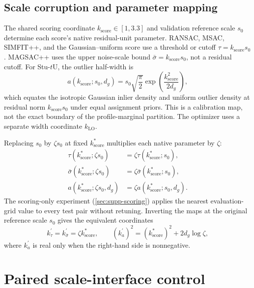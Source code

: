 \documentclass[runningheads]{llncs}
\newcommand{\stuU}{Stu-$t$U}
\newcommand{\kscore}{k_{\mathrm{score}}}
\newcommand{\klo}{k_{\mathrm{LO}}}
\begin{document}
\subsection{Scale corruption and parameter mapping}
\label{sec:supp-scale-mapping}
The shared scoring coordinate $\kscore\in[1,3.3]$ and validation reference
scale $s_0$ determine each score's native residual-unit parameter. RANSAC,
MSAC, SIMFIT++, and the Gaussian--uniform score use a threshold or cutoff
$\tau=\kscore s_0$. MAGSAC++ uses the upper noise-scale bound
$\bar\sigma=\kscore s_0$, not a residual cutoff. For \stuU{}, the outlier
half-width is
\begin{equation}
a(\kscore;s_0,d_g)=s_0\sqrt{\frac{\pi}{2}}
\exp\!\left(\frac{\kscore^2}{2d_g}\right),
\label{eq:native-scale-maps}
\end{equation}
which equates the isotropic Gaussian inlier density and uniform outlier
density at residual norm $\kscore s_0$ under equal assignment priors. This
is a calibration map, not the exact boundary of the profile-marginal
partition. The optimizer uses a separate width coordinate $\klo$.

Replacing $s_0$ by $\zeta s_0$ at fixed $\kscore^*$ multiplies each native
parameter by $\zeta$:
\begin{equation}
\begin{aligned}
\tau(\kscore^*;\zeta s_0)&=\zeta\tau(\kscore^*;s_0),\\
\bar\sigma(\kscore^*;\zeta s_0)&=\zeta\bar\sigma(\kscore^*;s_0),\\
a(\kscore^*;\zeta s_0,d_g)&=\zeta a(\kscore^*;s_0,d_g).
\end{aligned}
\label{eq:native-scale-corruption}
\end{equation}
The scoring-only experiment (\cref{sec:supp-scoring}) applies the nearest
evaluation-grid value to every test pair without retuning. Inverting the maps
at the original reference scale $s_0$ gives the equivalent coordinates
\begin{equation}
k_{\tau}^{\prime}=k_{\bar\sigma}^{\prime}=\zeta\kscore^*,
\qquad
(k_a^{\prime})^2=(\kscore^*)^2+2d_g\log\zeta,
\label{eq:corrupted-cutoff}
\end{equation}
where $k_a^{\prime}$ is real only when the right-hand side is nonnegative.

\section{Paired scale-interface control}
\label{sec:supp-anchoring}
\end{document}
